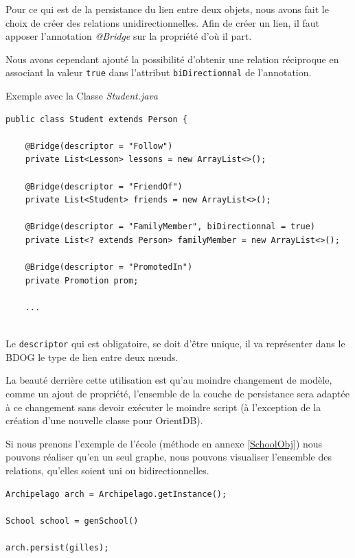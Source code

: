 \documentclass[a4paper,fleqn,12pt]{report}
\begin{document}
Pour ce qui est de la persistance du lien entre deux objets, nous avons fait le choix de créer des relations unidirectionnelles. Afin de créer un lien, il faut apposer l'annotation \textit{@Bridge} sur la propriété d'où il part.

Nous avons cependant ajouté la possibilité d'obtenir une relation réciproque en associant la valeur \texttt{true} dans l'attribut \texttt{biDirectionnal} de l'annotation. 

Exemple avec la Classe \textit{Student.java}

\begin{lstlisting}
public class Student extends Person {

    @Bridge(descriptor = "Follow")
    private List<Lesson> lessons = new ArrayList<>();
    
    @Bridge(descriptor = "FriendOf")
    private List<Student> friends = new ArrayList<>();
    
    @Bridge(descriptor = "FamilyMember", biDirectionnal = true)
    private List<? extends Person> familyMember = new ArrayList<>();
    
    @Bridge(descriptor = "PromotedIn")
    private Promotion prom;
    
    ...
    
\end{lstlisting}

Le \texttt{descriptor} qui est obligatoire, se doit d'être unique, il va représenter dans le BDOG le type de lien entre deux nœuds.

La beauté derrière cette utilisation est qu'au moindre changement de modèle, comme un ajout de propriété, l'ensemble de la couche de persistance sera adaptée à ce changement sans devoir exécuter le moindre script (à l'exception de la création d'une nouvelle classe pour OrientDB).

Si nous prenons l'exemple de l'école (méthode en annexe \ref{SchoolObj}) nous pouvons réaliser qu'en un seul graphe, nous pouvons visualiser l'ensemble des relations, qu'elles soient uni ou bidirectionnelles.

\begin{lstlisting}
Archipelago arch = Archipelago.getInstance();

School school = genSchool()

arch.persist(gilles);
\end{lstlisting}
\end{document}
